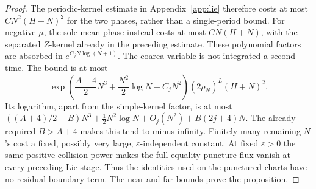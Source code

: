 \documentclass[11pt]{article}
\numberwithin{equation}{section}
\theoremstyle{definition}
\newcommand{\eps}{\varepsilon}
\begin{document}
\begin{proof}
The periodic-kernel estimate in Appendix~\ref{app:lie} therefore
costs at most \(CN^2(H+N)^2\) for the two phases, rather than a
single-period bound. For negative \(\mu\), the sole mean phase
instead costs at most \(CN(H+N)\), with the separated \(Z\)-kernel
already in the preceding estimate. These polynomial factors are
absorbed in \(e^{C_jN\log(N+1)}\). The coarea variable is not
integrated a second time. The bound is at most
\[
 \exp\left(\frac{A+4}{2}N^3+\frac{N^2}{2}\log N+C_jN^2\right)
 (2\rho_N)^L(H+N)^2.
\]
Its logarithm, apart from the simple-kernel factor, is at most
\(((A+4)/2-B)N^3+\tfrac12N^2\log N+O_j(N^2)+B(2j+4)N\).
The already required \(B>A+4\) makes this tend to minus infinity.
Finitely many remaining \(N\)'s cost a fixed, possibly very large,
\(\eps\)-independent constant.
At fixed \(\eps>0\) the same positive collision power makes the
full-equality puncture flux vanish at every preceding Lie stage.
Thus the identities used on the punctured charts have no residual
boundary term. The near and far bounds prove the proposition.
\end{proof}
\end{document}
